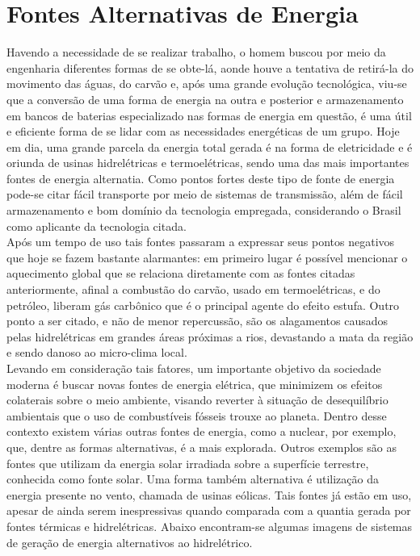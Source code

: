 \documentclass[11pt, a4paper, oneside]{article}
\begin{document}
\section{Fontes Alternativas de Energia}
Havendo a necessidade de se realizar trabalho, o homem buscou por meio
da engenharia diferentes formas de se obte-lá, aonde houve a tentativa de
retirá-la do movimento das águas, do carvão e, após uma grande evolução
tecnológica, viu-se que a conversão de uma forma de energia na outra e posterior e
armazenamento em bancos de baterias especializado nas formas de energia em
questão, é uma útil e eficiente forma de se lidar com as necessidades energéticas
de um grupo. Hoje em dia, uma grande parcela da energia total gerada é na forma
de eletricidade e é oriunda de usinas hidrelétricas e termoelétricas, sendo uma das
mais importantes fontes de energia alternatia. Como pontos fortes deste tipo de fonte de energia
pode-se citar fácil transporte por meio de sistemas de transmissão, além de fácil
armazenamento e bom domínio da tecnologia empregada, considerando o Brasil como aplicante da tecnologia citada.\\
Após um tempo de uso tais fontes passaram a expressar seus pontos
negativos que hoje se fazem bastante alarmantes: em primeiro lugar é possível
mencionar o aquecimento global que se relaciona diretamente com as fontes
citadas anteriormente, afinal a combustão do carvão, usado em termoelétricas, e do
petróleo, liberam gás carbônico que é o principal agente do efeito estufa. Outro
ponto a ser citado, e não de menor repercussão, são os alagamentos causados pelas
hidrelétricas em grandes áreas próximas a rios, devastando a mata da região e
sendo danoso ao micro-clima local.\cite{meio_ambiente}\\
Levando em consideração tais fatores, um importante objetivo da sociedade
moderna é buscar novas fontes de energia elétrica, que minimizem os efeitos
colaterais sobre o meio ambiente, visando reverter à situação de desequilíbrio
ambientais que o uso de combustíveis fósseis trouxe ao planeta.
Dentro desse contexto existem várias outras fontes de energia, como a
nuclear, por exemplo, que, dentre as formas alternativas, é a mais explorada.
Outros exemplos são as fontes que utilizam da energia solar irradiada sobre a
superfície terrestre, conhecida como fonte solar. Uma forma também alternativa é
utilização da energia presente no vento, chamada de usinas eólicas. Tais fontes já
estão em uso, apesar de ainda serem inespressivas quando comparada com a
quantia gerada por fontes térmicas e hidrelétricas. Abaixo encontram-se algumas
imagens de sistemas de geração de energia alternativos ao hidrelétrico.
\end{document}
